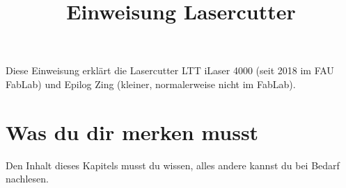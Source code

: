 \documentclass{\basedir/fablab-document}
\title{Einweisung Lasercutter}
\makeatletter
\newcommand{\smaller}{\ifdim\f@size pt>10pt \small \fi}
\newcommand{\english}[1]{{\smaller \color{gray} \itshape #1}}
\renewcommand{\english}[1]{}
\makeatother
\begin{document}
	\maketitle

	Diese Einweisung erklärt die Lasercutter LTT iLaser 4000 (seit 2018 im FAU FabLab) und Epilog Zing (kleiner, normalerweise nicht im FabLab).

	\english{This instruction explains the laser cutters LTT iLaser 4000 (in the FAU FabLab since 2018) and Epilog Zing (smaller, usually not in the FabLab).}

	\section{Was du dir merken musst \english{What you need to remember}}
	Den Inhalt dieses Kapitels musst du wissen, alles andere kannst du bei Bedarf nachlesen.

	\english{You must know the content of this chapter. You can look up everything else as needed.}
\end{document}
